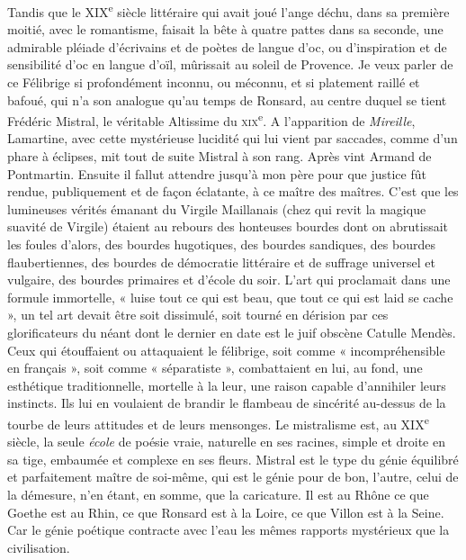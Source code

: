\documentclass[french,twoside]{book} %
\begin{document}
Tandis que le XIX\textsuperscript{e} siècle littéraire qui avait joué l’ange déchu, dans sa première moitié, avec le romantisme, faisait la bête à quatre pattes dans sa seconde, une admirable pléiade d’écrivains et de poètes de langue d’oc, ou d’inspiration et de sensibilité d’oc en langue d’oïl, mûrissait au soleil de Provence. Je veux parler de ce Félibrige si profondément inconnu, ou méconnu, et si platement raillé et bafoué, qui n’a son analogue qu’au temps de Ronsard, au centre duquel se tient Frédéric Mistral, le véritable Altissime du \textsc{xix}\textsuperscript{e}. A l’apparition de {\itshape Mireille}, Lamartine, avec cette mystérieuse lucidité qui lui vient par saccades, comme d’un phare à éclipses, mit tout de suite Mistral à son rang. Après vint Armand de Pontmartin. Ensuite il fallut attendre jusqu’à mon père pour que justice fût rendue, publiquement et de façon éclatante, à ce maître des maîtres. C’est que les lumineuses vérités émanant du Virgile Maillanais (chez qui revit la magique suavité de Virgile) étaient au rebours des honteuses bourdes dont on abrutissait les foules d’alors, des bourdes hugotiques, des bourdes sandiques, des bourdes flaubertiennes, des bourdes de démocratie littéraire et de suffrage universel et vulgaire, des bourdes primaires et d’école du soir. L’art qui proclamait dans une formule immortelle, « luise tout ce qui est beau, que tout ce qui est laid se cache », un tel art devait être soit dissimulé, soit tourné en dérision par ces glorificateurs du néant dont le dernier en date est le juif obscène Catulle Mendès. Ceux qui étouffaient ou attaquaient le félibrige, soit comme « incompréhensible en français », soit comme « séparatiste », combattaient en lui, au fond, une esthétique traditionnelle, mortelle à la leur, une raison capable d’annihiler leurs instincts. Ils lui en voulaient de brandir le flambeau de sincérité au-dessus de la tourbe de leurs attitudes et de leurs mensonges. Le mistralisme est, au XIX\textsuperscript{e} siècle, la seule {\itshape école} de poésie vraie, naturelle en ses racines, simple et droite en sa tige, embaumée et complexe en ses fleurs. Mistral est le type du génie équilibré et parfaitement maître de soi-même, qui est le génie pour de bon, l’autre, celui de la démesure, n’en étant, en somme, que la caricature. Il est au Rhône ce que Goethe est au Rhin, ce que Ronsard est à la Loire, ce que Villon est à la Seine. Car le génie poétique contracte avec l’eau les mêmes rapports mystérieux que la civilisation.\par
\end{document}
